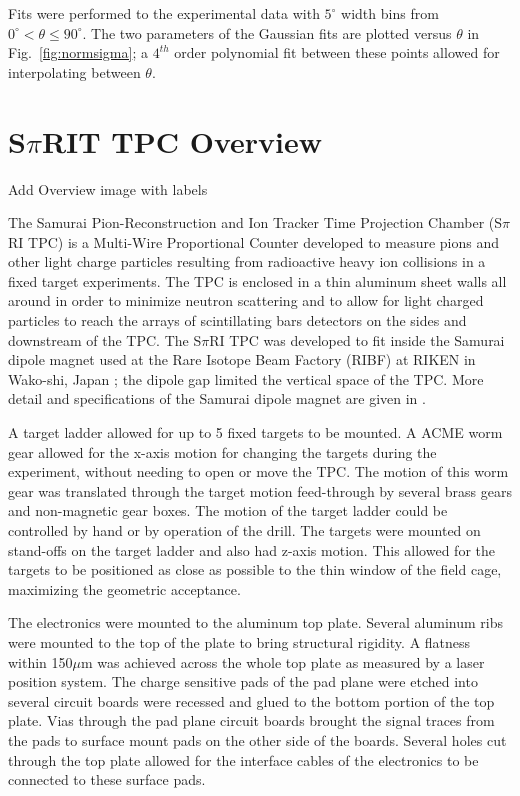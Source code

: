 Fits were performed to the experimental data with  $5^{\circ}$ width bins from $0^{\circ} < \theta \leq 90^{\circ}$. The two parameters of the Gaussian fits are plotted versus $\theta$ in Fig.~\ref{fig:normsigma}; a $4^{th}$ order polynomial fit between these points allowed for interpolating between $\theta$.




\section{S$\pi$RIT TPC Overview}
Add Overview image with labels


The Samurai Pion-Reconstruction and Ion Tracker Time Projection Chamber (S$\pi$RI TPC) is a Multi-Wire Proportional Counter developed to measure pions and other light charge particles resulting from radioactive heavy ion collisions in a fixed target experiments.  The TPC is enclosed in a thin aluminum sheet walls all around in order to minimize neutron scattering and to allow for light charged particles to reach the arrays of scintillating bars detectors on the sides and downstream of the TPC. The S$\pi$RI TPC was developed to fit inside the Samurai dipole magnet used at the Rare Isotope Beam Factory (RIBF) at RIKEN in Wako-shi, Japan \cite{riken}; the dipole gap limited the vertical space of the TPC. More detail and specifications of the Samurai dipole magnet are given in \cite{samurai}. 

A target ladder allowed for up to 5 fixed targets to be mounted. A ACME worm gear allowed for the x-axis motion for changing the targets during the experiment, without needing to open or move the TPC. The motion of this worm gear was translated through the target motion feed-through by several brass gears and non-magnetic gear boxes. The motion of the target ladder could be controlled by hand or by operation of the drill. The targets were mounted on stand-offs on the target ladder and also had z-axis motion. This allowed for the targets to be positioned as close as possible to the thin window of the field cage, maximizing the geometric acceptance. 

The electronics were mounted to the aluminum top plate. Several aluminum ribs were mounted to the top of the plate to bring structural rigidity. A flatness within 150$\mu$m was achieved across the whole top plate as measured by a laser position system. The charge sensitive pads of the pad plane were etched into several circuit boards were recessed and glued to the bottom portion of the top plate. Vias through the pad plane circuit boards brought the signal traces from the pads to surface mount pads on the other side of the boards. Several holes cut through the top plate allowed for the interface cables of the electronics to be connected to these surface pads. 

